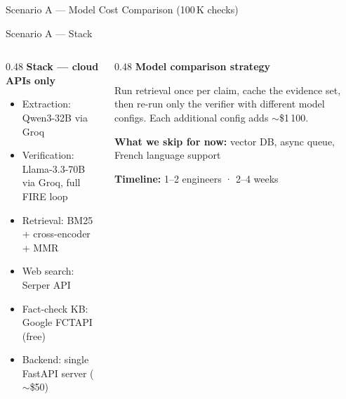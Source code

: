 \documentclass[11pt, aspectratio=169]{beamer}
\begin{document}
\begin{frame}{Scenario A — Model Cost Comparison (100\,K checks)}
%

\end{frame}

\begin{frame}{Scenario A — Stack}
  \begin{columns}[T]
    \begin{column}{0.48\textwidth}
      \textbf{Stack — cloud APIs only}
      \begin{itemize}\setlength{\itemsep}{10pt}
        \item Extraction: Qwen3-32B via Groq
        \item Verification: Llama-3.3-70B via Groq, full FIRE loop
        \item Retrieval: BM25 + cross-encoder + MMR
        \item Web search: Serper API
        \item Fact-check KB: Google FCTAPI (free)
        \item Backend: single FastAPI server ($\sim$\$50)
      \end{itemize}
    \end{column}
    \begin{column}{0.48\textwidth}
      \textbf{Model comparison strategy}

      \medskip
      Run retrieval once per claim, cache the evidence set,
      then re-run only the verifier with different model configs.
      Each additional config adds $\sim$\$1\,100.

      \bigskip
      \textbf{What we skip for now:}
      vector DB, async queue, French language support

      \bigskip
      \textbf{Timeline:} 1--2 engineers · 2--4 weeks
    \end{column}
  \end{columns}
\end{frame}
\end{document}
